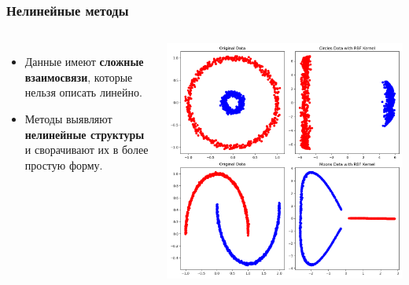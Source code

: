 \begin{frame}
    \frametitle{Нелинейные методы}
    \begin{columns}
        \begin{itemize}
            \item Данные имеют \textbf{сложные взаимосвязи}, которые нельзя описать линейно.
            \item Методы выявляют \textbf{нелинейные структуры} и сворачивают их в более простую форму.
        \end{itemize}
        \begin{center}
            \includegraphics[width=1\textwidth]{../resources/methods/kpca.png}
        \end{center}
    \end{columns}
\end{frame}

